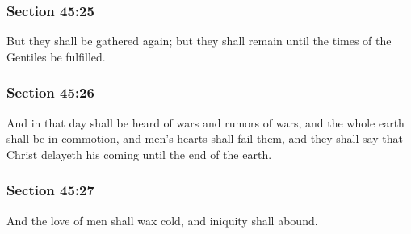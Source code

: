 	\subsubsection{Section 45:25} %
		\label{DC45-25}

		But they shall be gathered again; but they shall remain until the times of the Gentiles be fulfilled.


	\subsubsection{Section 45:26} %
		\label{DC45-26}

		And in that day shall be heard of wars and rumors of wars, and the whole earth shall be in commotion, and men's hearts shall fail them, and they shall say that Christ delayeth his coming until the end of the earth.


	\subsubsection{Section 45:27} %
		\label{DC45-27}

		And the love of men shall wax cold, and iniquity shall abound.


